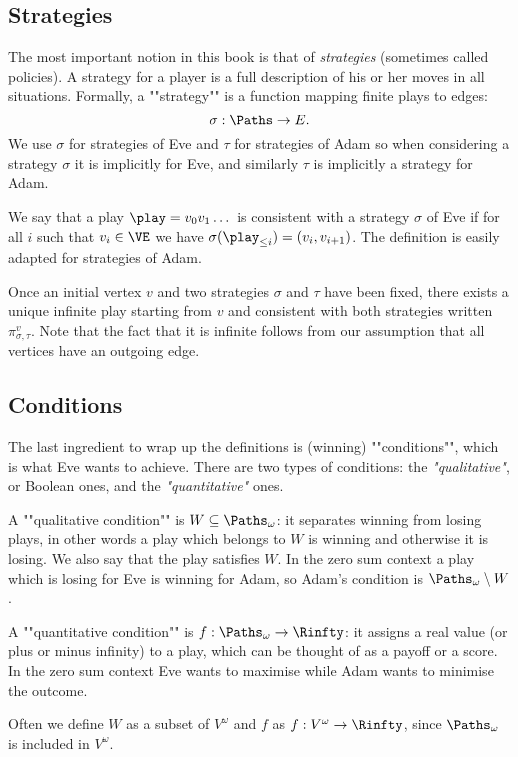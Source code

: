 \subsection*{Strategies}
The most important notion in this book is that of \textit{strategies} (sometimes called policies).
A strategy for a player is a full description of his or her moves in all situations.
Formally, a ""strategy"" is a function mapping finite plays to edges: 
\[
\sigma : \Paths \to E.
\]
We use $\sigma$ for strategies of Eve and $\tau$ for strategies of Adam so when considering a strategy $\sigma$ it is implicitly for Eve,
and similarly $\tau$ is implicitly a strategy for Adam.

We say that a play $\play = v_0 v_1 \dots$ is consistent with a strategy $\sigma$ of Eve if
for all $i$ such that $v_i \in \VE$ we have $\sigma(\play_{\le i}) = (v_i,v_{i+1})$.
The definition is easily adapted for strategies of Adam.

Once an initial vertex $v$ and two strategies $\sigma$ and $\tau$ have been fixed, 
there exists a unique infinite play starting from $v$ and consistent with both strategies written~$\pi^{v}_{\sigma,\tau}$.
Note that the fact that it is infinite follows from our assumption that all vertices have an outgoing edge.

\subsection*{Conditions}
The last ingredient to wrap up the definitions is (winning) ""conditions"", which is what Eve wants to achieve.
There are two types of conditions: the \emph{"qualitative"}, or Boolean ones, and the \emph{"quantitative"} ones.

A ""qualitative condition"" is $W \subseteq \Paths_\omega$: it separates winning from losing plays, in other words a play which belongs to $W$ is winning and otherwise it is losing. We also say that the play satisfies $W$.
In the zero sum context a play which is losing for Eve is winning for Adam, so Adam's condition is $\Paths_\omega \setminus W$.

A ""quantitative condition"" is $f : \Paths_\omega \to \Rinfty$: it assigns a real value (or plus or minus infinity) to a play, which can be thought of as a payoff or a score.
In the zero sum context Eve wants to maximise while Adam wants to minimise the outcome.

Often we define $W$ as a subset of $V^\omega$ and $f$ as $f : V^\omega \to \Rinfty$,
since $\Paths_\omega$ is included in $V^\omega$.

